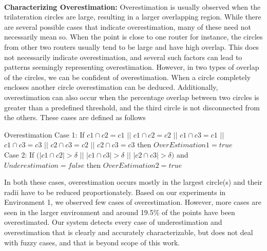\documentclass[twocolumn]{svjour3}
\begin{document}
\\

\textbf{Characterizing Overestimation:} Overestimation is usually observed when the trilateration circles are large, resulting in a larger overlapping region. While there are several possible cases that indicate overestimation, many of these need not necessarily mean so. When the point is close to one router for instance, the circles from other two routers usually tend to be large and have high overlap. This does not necessarily indicate overestimation, and several such factors can lead to patterns seemingly representing overestimation. However, in two types of overlap of the circles, we can be confident of overestimation. When a circle completely encloses another circle overestimation can be deduced. Additionally, overestimation can also occur when the percentage overlap between two circles is greater than a predefined threshold, and the third circle is not disconnected from the others. These cases are defined as follows

\begin{definition}{Overestimation}
Case 1: If $c1 \cap c2 = c1$ $||$ $c1 \cap c2 = c2$ $||$ $c1 \cap c3 = c1$ $||$ $c1 \cap c3 = c3$ $||$ $c2 \cap c3 = c2$ $||$ $c2 \cap c3 = c3$ then  $OverEstimation1 = true$ \\
Case 2: If $(|c1 \cap c2| > \delta$ $||$ $|c1 \cap c3| > \delta$ $||$ $|c2 \cap c3|>\delta)$ and $Underestimation = false$ then $OverEstimation2 = true $
\label{def:over}
\end{definition}

In both these cases, overestimation occurs mostly in the largest circle(s) and their radii have to be reduced proportionately. Based on our experiments in Environment 1, we observed few cases of overestimation. However, more cases are seen in the larger environment and around 19.5\% of the points have been overestimated. Our system detects every case of underestimation and overestimation that is clearly and accurately characterizable, but does not deal with fuzzy cases, and that is beyond scope of this work. 
\end{document}
